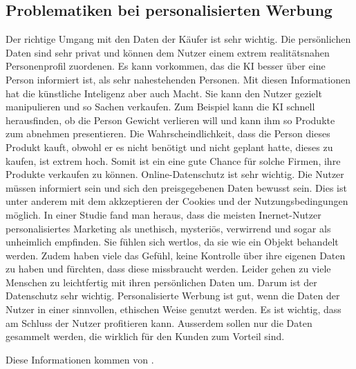 \documentclass{article}
\begin{document}
\subsection{Problematiken bei personalisierten Werbung}

Der richtige Umgang mit den Daten der Käufer ist sehr wichtig. Die persönlichen Daten sind sehr privat und können dem Nutzer einem extrem realitätsnahen Personenprofil zuordenen. Es kann vorkommen, das die KI besser über eine Person informiert ist, als sehr nahestehenden Personen. Mit diesen Informationen hat die künstliche Inteligenz aber auch Macht. Sie kann den Nutzer gezielt manipulieren und so Sachen verkaufen. Zum Beispiel kann die KI schnell herausfinden, ob die Person Gewicht verlieren will und kann ihm so Produkte zum abnehmen presentieren. Die Wahrscheindlichkeit, dass die Person dieses Produkt kauft, obwohl er es nicht benötigt und nicht geplant hatte, dieses zu kaufen, ist extrem hoch. Somit ist ein eine gute Chance für solche Firmen, ihre Produkte verkaufen zu können. Online-Datenschutz ist sehr wichtig. Die Nutzer müssen informiert sein und sich den preisgegebenen Daten bewusst sein. Dies ist unter anderem mit dem akkzeptieren der Cookies und der Nutzungsbedingungen möglich. In einer Studie fand man heraus, dass die meisten Inernet-Nutzer personalisiertes Marketing als unethisch, mysteriös, verwirrend und sogar als unheimlich empfinden. Sie fühlen sich wertlos, da sie wie ein Objekt behandelt werden. Zudem haben viele das Gefühl, keine Kontrolle über ihre eigenen Daten zu haben und fürchten, dass diese missbraucht werden. Leider gehen zu viele Menschen zu leichtfertig mit ihren persönlichen Daten um. Darum ist der Datenschutz sehr wichtig. 
Personalisierte Werbung ist gut, wenn die Daten der Nutzer in einer sinnvollen, ethischen Weise genutzt werden. Es ist wichtig, dass am Schluss der Nutzer profitieren kann. Ausserdem sollen nur die Daten gesammelt werden, die wirklich für den Kunden zum Vorteil sind. 

Diese Informationen kommen von \citep{Basicthinking}. 

\printbibliography

\nocite{*}
\end{document}
